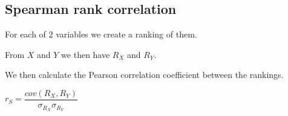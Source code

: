 
\subsection{Spearman rank correlation}

For each of \(2\) variables we create a ranking of them.

From \(X\) and \(Y\) we then have \(R_X\) and \(R_Y\).

We then calculate the Pearson correlation coefficient between the rankings.

\(r_S=\dfrac{cov(R_X, R_Y)}{\sigma_{R_X}\sigma_{R_Y}}\)

